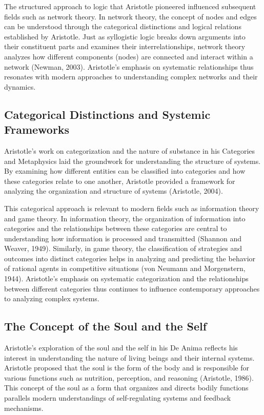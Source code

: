 \documentclass[twocolumn]{article}
\begin{document}
\textcolor{primary}{The structured approach to logic that Aristotle pioneered influenced subsequent fields such as network theory. In network theory, the concept of nodes and edges can be understood through the categorical distinctions and logical relations established by Aristotle. Just as syllogistic logic breaks down arguments into their constituent parts and examines their interrelationships, network theory analyzes how different components (nodes) are connected and interact within a network (Newman, 2003). Aristotle's emphasis on systematic relationships thus resonates with modern approaches to understanding complex networks and their dynamics.}


\subsection{Categorical Distinctions and Systemic Frameworks}

\textcolor{primary}{Aristotle’s work on categorization and the nature of substance in his Categories and Metaphysics laid the groundwork for understanding the structure of systems. By examining how different entities can be classified into categories and how these categories relate to one another, Aristotle provided a framework for analyzing the organization and structure of systems (Aristotle, 2004).}

\textcolor{secondary}{This categorical approach is relevant to modern fields such as information theory and game theory. In information theory, the organization of information into categories and the relationships between these categories are central to understanding how information is processed and transmitted (Shannon and Weaver, 1949). Similarly, in game theory, the classification of strategies and outcomes into distinct categories helps in analyzing and predicting the behavior of rational agents in competitive situations (von Neumann and Morgenstern, 1944). Aristotle’s emphasis on systematic categorization and the relationships between different categories thus continues to influence contemporary approaches to analyzing complex systems.}

\subsection{The Concept of the Soul and the Self}

\textcolor{primary}{Aristotle’s exploration of the soul and the self in his De Anima reflects his interest in understanding the nature of living beings and their internal systems. Aristotle proposed that the soul is the form of the body and is responsible for various functions such as nutrition, perception, and reasoning (Aristotle, 1986). This concept of the soul as a form that organizes and directs bodily functions parallels modern understandings of self-regulating systems and feedback mechanisms.}
\end{document}

